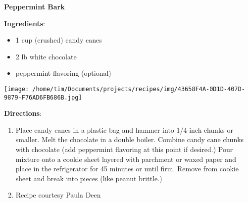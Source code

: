 \documentclass[11pt, twoside, openany]{book}
\begin{document}
\noindent\begin{minipage}[t]{\linewidth}%
{\Large\textbf{Peppermint Bark}} \label{peppermint-bark}\hfill\textit{}\\
\noindent\begin{minipage}[t]{0.78\linewidth}%
\textbf{Ingredients}:\vspace{-3mm}
\begin{multicols}{2}
\begin{itemize}\setlength\itemsep{-1mm}
\item 1 cup (crushed) candy canes
\item 2 lb white chocolate
\item peppermint flavoring (optional)
\end{itemize}
\end{multicols}
\end{minipage}
\noindent\begin{minipage}[t]{0.18\linewidth}
\centering \strut\vspace*{-\baselineskip}\newline
\texttt{[image: /home/tim/Documents/projects/recipes/img/43658F4A-0D1D-407D-9879-F76AD6FB686B.jpg]}\\
\end{minipage}\vspace{3mm}
\textbf{Directions}:
\vspace{-3mm}\begin{enumerate}\setlength\itemsep{-1mm}
\item Place candy canes in a plastic bag and hammer into 1/4-inch chunks or smaller. Melt the chocolate in a double boiler. Combine candy cane chunks with chocolate (add peppermint flavoring at this point if desired.) Pour mixture onto a cookie sheet layered with parchment or waxed paper and place in the refrigerator for 45 minutes or until firm. Remove from cookie sheet and break into pieces (like peanut brittle.)
\item Recipe courtesy Paula Deen
\end{enumerate}
\end{minipage}\vspace{8mm}
\end{document}
